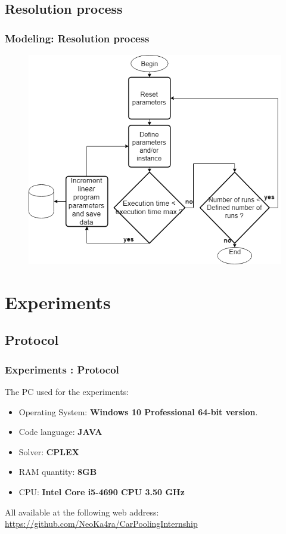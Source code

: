 \documentclass{beamer}
\begin{document}
	\subsection{Resolution process}
	\begin{frame}
		\frametitle{Modeling: Resolution process}
		\begin{figure}
		\centering
			\includegraphics[width=.8\textwidth]{img/i_presflowchart}
		\end{figure}
	\end{frame}
	\section{Experiments}
	\subsection{Protocol}
	\begin{frame}
		\frametitle{Experiments : Protocol}
		The PC used for the experiments:
		\begin{itemize}
		\item Operating System: \textbf{Windows 10 Professional 64-bit version}. 
		\item Code language: \textbf{JAVA }
		\item Solver: \textbf{CPLEX}
		\item RAM quantity: \textbf{8GB}
		\item CPU: \textbf{Intel Core i5-4690 CPU 3.50 GHz}
		\end{itemize}
		All available at the following web address: \url{https://github.com/NeoKa4ra/CarPoolingInternship}
	\end{frame}
\end{document}
